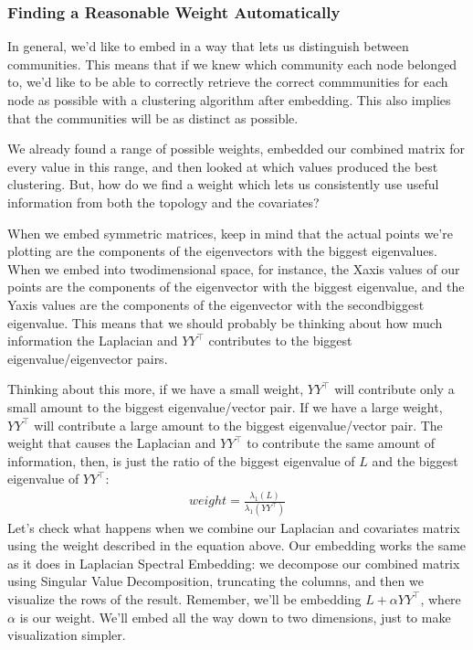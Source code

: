 \documentclass[letterpaper,10pt,english]{jupyterBook}
\begin{document}
\subsubsection{Finding a Reasonable Weight Automatically}
\label{\detokenize{representations/ch6/joint-representation-learning:finding-a-reasonable-weight-automatically}}
\sphinxAtStartPar
In general, we’d like to embed in a way that lets us distinguish between communities. This means that if we knew which community each node belonged to, we’d like to be able to correctly retrieve the correct commmunities for each node as possible with a clustering algorithm after embedding. This also implies that the communities will be as distinct as possible.

\sphinxAtStartPar
We already found a range of possible weights, embedded our combined matrix for every value in this range, and then looked at which values produced the best clustering. But, how do we find a weight which lets us consistently use useful information from both the topology and the covariates?

\sphinxAtStartPar
When we embed symmetric matrices, keep in mind that the actual points we’re plotting are the components of the eigenvectors with the biggest eigenvalues. When we embed into two\sphinxhyphen{}dimensional space, for instance, the X\sphinxhyphen{}axis values of our points are the components of the eigenvector with the biggest eigenvalue, and the Y\sphinxhyphen{}axis values are the components of the eigenvector with the second\sphinxhyphen{}biggest eigenvalue. This means that we should probably be thinking about how much information the Laplacian and \(YY^\top\) contributes to the biggest eigenvalue/eigenvector pairs.

\sphinxAtStartPar
Thinking about this more, if we have a small weight, \(YY^\top\) will contribute only a small amount to the biggest eigenvalue/vector pair. If we have a large weight, \(YY^\top\) will contribute a large amount to the biggest eigenvalue/vector pair. The weight that causes the Laplacian and \(YY^\top\) to contribute the same amount of information, then, is just the ratio of the biggest eigenvalue of \(L\) and the biggest eigenvalue of \(YY^\top\):
\begin{equation*}
\begin{split}
weight = \frac{\lambda_1 (L)}{\lambda_1 (YY^\top)}
\end{split}
\end{equation*}
\sphinxAtStartPar
Let’s check what happens when we combine our Laplacian and covariates matrix using the weight described in the equation above. Our embedding works the same as it does in Laplacian Spectral Embedding: we decompose our combined matrix using Singular Value Decomposition, truncating the columns, and then we visualize the rows of the result. Remember, we’ll be embedding \(L + \alpha YY^\top\), where \(\alpha\) is our weight. We’ll embed all the way down to two dimensions, just to make visualization simpler.
\end{document}
